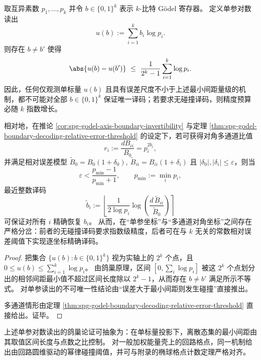 \begin{theorem}\label{thm:spg-single-parameter-log-readout-vs-diagonal-multichannel-bifurcation}
取互异素数 \(p_1,\dots,p_k\) 并令 \(b\in\{0,1\}^k\) 表示 \(k\)-比特 Gödel 寄存器。
定义单参对数读出
\[
u(b):=\sum_{i=1}^k b_i\log p_i.
\]
则存在 \(b\neq b'\) 使得
\[
\abs{u(b)-u(b')}
\ \le\
\frac{1}{2^k-1}\sum_{i=1}^k \log p_i.
\]
因此，任何仅观测单标量 \(u(b)\) 且具有误差尺度不小于上述最小间距量级的机制，都不可能对全部 \(b\in\{0,1\}^k\) 保证唯一译码；若要求无碰撞译码，则精度预算必随 \(k\) 指数增长。
\par
相对地，在推论 \ref{cor:spg-godel-axis-boundary-invertibility} 与定理 \ref{thm:spg-godel-boundary-decoding-relative-error-threshold} 的设定下，若可获得对角多通道比值
\[
r_i:=\frac{dB_{ii}}{B_0}=p_i^{2b_i},
\]
并满足相对误差模型
\(
\widetilde B_0=B_0(1+\delta_0),\ 
\widetilde B_{ii}=B_{ii}(1+\delta_i)
\)
且 \(|\delta_0|,|\delta_i|\le\varepsilon\)，则当
\[
\varepsilon<\frac{p_{\min}-1}{p_{\min}+1},
\qquad
p_{\min}:=\min_i p_i,
\]
最近整数译码
\[
\widetilde b_i:=\left\lfloor \frac{1}{2\log p_i}\log\!\left(\frac{d\,\widetilde B_{ii}}{\widetilde B_0}\right)\right\rceil
\]
可保证对所有 \(i\) 精确恢复 \(b_i\)。
从而，在“单参坐标”与“多通道对角坐标”之间存在严格分岔：前者的无碰撞译码要求指数级精度，后者可在与 \(k\) 无关的常数相对误差阈值下实现逐坐标精确译码。
\end{theorem}
\begin{proof}
把集合 \(\{u(b):b\in\{0,1\}^k\}\) 视为实轴上的 \(2^k\) 个点，且
\(
0\le u(b)\le \sum_{i=1}^k\log p_i
\)。
由鸽巢原理，区间 \([0,\sum_i\log p_i]\) 被这 \(2^k\) 个点划分出的相邻间距最小值不超过区间长度除以 \(2^k-1\)，从而存在 \(b\neq b'\) 满足所示不等式。
对单参读出的不可唯一性结论由“误差大于最小间距则发生碰撞”直接推出。
\par
多通道情形由定理 \ref{thm:spg-godel-boundary-decoding-relative-error-threshold} 直接给出。证毕。
\leanverified{weightedSum}
\leanverified{pigeonhole\_k\_one}
\end{proof}

\par
上述单参对数读出的鸽巢论证可抽象为：在单标量投影下，离散态集的最小间距由其取值区间长度与点数之比控制。
对一般加权能量壳上的回路格点，同一机制给出由回路圆维驱动的幂律碰撞阈值，并可与附录的椭球格点计数定理严格对齐。

